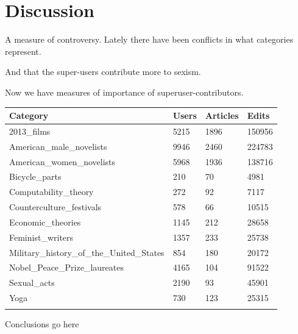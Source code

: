 \documentclass{acm_proc_article-sp}
\begin{document}
\section{Discussion}

A measure of controversy. Lately there have been conflicts in what categories represent.  \cite{website:nyt}

And that the super-users contribute more to sexism.\cite{website:wikinewsreporter}

 Now we have measures of importance of superuser-contributors. 


\begin{tabular}{llll}
\toprule
Category & Users & Articles &  Edits \\
\midrule
2013\_films &  5215 &     1896 &  150956 \\
American\_male\_novelists &  9946 &     2460 &  224783 \\
American\_women\_novelists &  5968 &     1936 &  138716 \\
Bicycle\_parts &   210 &       70 &    4981 \\
Computability\_theory &   272 &       92 &    7117 \\
Counterculture\_festivals &   578 &       66 &   10515 \\
Economic\_theories &  1145 &      212 &   28658 \\
Feminist\_writers &  1357 &      233 &   25738 \\
Military\_history\_of\_the\_United\_States &   854 &      180 &   20172 \\
Nobel\_Peace\_Prize\_laureates &  4165 &      104 &   91522 \\
Sexual\_acts &  2190 &       93 &   45901 \\
Yoga &   730 &      123 &   25315 \\
\bottomrule
\label{tab:statistics}
\end{tabular}


Conclusions go here



  

%
%
\end{document}

